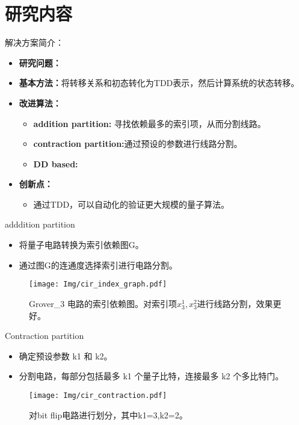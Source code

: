 \documentclass[aspectratio=1610]{ctexbeamer}
\begin{document}
\section{研究内容}
\begin{frame}{解决方案简介：}
    \begin{itemize}
        \item \textbf{研究问题：}
        \item \textbf{基本方法：}将转移关系和初态转化为TDD表示，然后计算系统的状态转移。
        \item \textbf{改进算法：}
        \begin{itemize}
            \item \textbf{addition partition:} 寻找依赖最多的索引项，从而分割线路。
            \item \textbf{contraction partition:}通过预设的参数进行线路分割。
            \item \textbf{DD based:}
        \end{itemize}
        \item \textbf{创新点：}
        \begin{itemize}
            \item 通过TDD，可以自动化的验证更大规模的量子算法。
        \end{itemize}
    \end{itemize}
\end{frame}
\begin{frame}{adddition partition}
    \begin{itemize}
        \item 将量子电路转换为索引依赖图G。
        \item 通过图G的连通度选择索引进行电路分割。
    \end{itemize}
    \begin{figure}
        \centering
        \texttt{[image: Img/cir\_index\_graph.pdf]}
        \caption{Grover\_3 电路的索引依赖图。对索引项$x_3^1,x_3^2$进行线路分割，效果更好。}
    \end{figure}
\end{frame}
\begin{frame}{Contraction partition}
    \begin{itemize}
        \item 确定预设参数 k1 和 k2。
        \item 分割电路，每部分包括最多 k1 个量子比特，连接最多 k2 个多比特门。
    \end{itemize}
    \begin{figure}
        \centering
        \texttt{[image: Img/cir\_contraction.pdf]}
        \caption{对bit flip电路进行划分，其中k1=3,k2=2。}
    \end{figure}
\end{frame}
\end{document}
